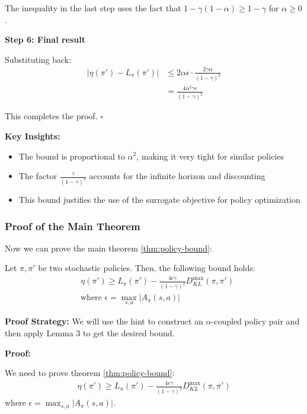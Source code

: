 The inequality in the last step uses the fact that $1-\gamma(1-\alpha) \ge 1-\gamma$ for $\alpha \ge 0$.

\textbf{Step 6: Final result}

Substituting back:
\begin{align}
|\eta(\pi') - L_{\pi}(\pi')| &\le 2\alpha\epsilon \cdot \frac{2\gamma\alpha}{(1-\gamma)^2} \\
&= \frac{4\alpha^2\gamma\epsilon}{(1-\gamma)^2}
\end{align}

This completes the proof. $\square$

\textbf{Key Insights:}
\begin{itemize}
    \item The bound is proportional to $\alpha^2$, making it very tight for similar policies
    \item The factor $\frac{\gamma}{(1-\gamma)^2}$ accounts for the infinite horizon and discounting
    \item This bound justifies the use of the surrogate objective for policy optimization
\end{itemize}

\subsubsection{Proof of the Main Theorem}

Now we can prove the main theorem \ref{thm:policy-bound}:

\begin{theorem}\label{thm:policy-bound}
    Let $\pi, \pi'$ be two stochastic policies. Then, the following bound holds:
    \begin{align*}
    &\eta(\pi') \ge L_{\pi}(\pi') - \frac{4\epsilon\gamma}{(1-\gamma)^2}D_{KL}^{\max}(\pi, \pi') \\
    &\text{where } \epsilon = \max_{s, a} |A_{\pi}(s, a)|
    \end{align*}
\end{theorem}

\textbf{Proof Strategy:}
We will use the hint to construct an $\alpha$-coupled policy pair and then apply Lemma 3 to get the desired bound.

\textbf{Proof:}

We need to prove theorem \ref{thm:policy-bound}:
\begin{align*}
\eta(\pi') \ge L_{\pi}(\pi') - \frac{4\epsilon\gamma}{(1-\gamma)^2}D_{KL}^{\max}(\pi, \pi')
\end{align*}
where $\epsilon = \max_{s, a} |A_{\pi}(s, a)|$.

